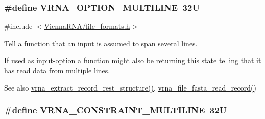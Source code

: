 \subsubsection[{\texorpdfstring{V\+R\+N\+A\+\_\+\+O\+P\+T\+I\+O\+N\+\_\+\+M\+U\+L\+T\+I\+L\+I\+NE}{VRNA_OPTION_MULTILINE}}]{\setlength{\rightskip}{0pt plus 5cm}\#define V\+R\+N\+A\+\_\+\+O\+P\+T\+I\+O\+N\+\_\+\+M\+U\+L\+T\+I\+L\+I\+NE~32U}\hypertarget{group__file__utils_gabec89c09874528c6cb73140a4c3d86d7}{}\label{group__file__utils_gabec89c09874528c6cb73140a4c3d86d7}


{\ttfamily \#include $<$\hyperlink{file__formats_8h}{Vienna\+R\+N\+A/file\+\_\+formats.\+h}$>$}



Tell a function that an input is assumed to span several lines. 

If used as input-\/option a function might also be returning this state telling that it has read data from multiple lines.

\begin{DoxySeeAlso}{See also}
\hyperlink{group__file__utils_gad37cbb63a05eed63ba25c91628409be0}{vrna\+\_\+extract\+\_\+record\+\_\+rest\+\_\+structure()}, \hyperlink{group__file__utils_ga8cfb7e271efc9e1f34640acb85475639}{vrna\+\_\+file\+\_\+fasta\+\_\+read\+\_\+record()} 
\end{DoxySeeAlso}
\subsubsection[{\texorpdfstring{V\+R\+N\+A\+\_\+\+C\+O\+N\+S\+T\+R\+A\+I\+N\+T\+\_\+\+M\+U\+L\+T\+I\+L\+I\+NE}{VRNA_CONSTRAINT_MULTILINE}}]{\setlength{\rightskip}{0pt plus 5cm}\#define V\+R\+N\+A\+\_\+\+C\+O\+N\+S\+T\+R\+A\+I\+N\+T\+\_\+\+M\+U\+L\+T\+I\+L\+I\+NE~32U}\hypertarget{group__file__utils_ga7d725ef525b29891abef3f1ed42599a4}{}\label{group__file__utils_ga7d725ef525b29891abef3f1ed42599a4}


